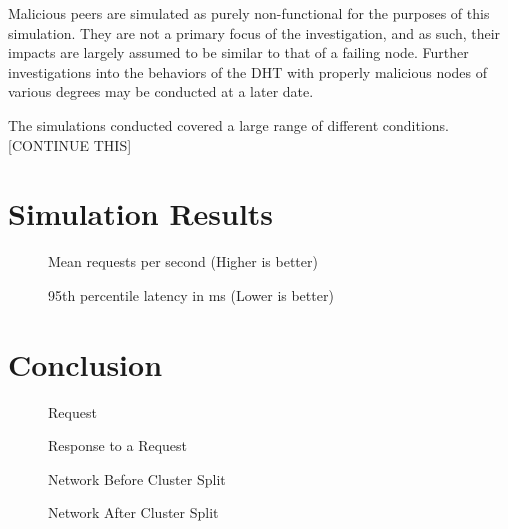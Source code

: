 \documentclass[apa6]{IEEEtran}
\theoremstyle{plain}
\begin{document}
	Malicious peers are simulated as purely non-functional for the purposes of this simulation. They are not a primary focus of the investigation, and as such, their impacts are largely assumed to be similar to that of a failing node. Further investigations into the behaviors of the DHT with properly malicious nodes of various degrees may be conducted at a later date.

	The simulations conducted covered a large range of different conditions. [CONTINUE THIS]

\section{Simulation Results}
	

	\begin{figure}[H]
		\centering
		\hspace*{-0.075\linewidth}
		
		\captionsetup{}
		\caption{Mean requests per second (Higher is better)}
		\label{fig:GMeanRPS}
	\end{figure}

	\begin{figure}[H]
		\centering
		\hspace*{-0.075\linewidth}
		
		\captionsetup{}
		\caption{95th percentile latency in ms (Lower is better)}
		\label{fig:GMeanRPS}
	\end{figure}

\section{Conclusion}






\begin{figure}
	\hspace*{-0.08\linewidth}
	\centering
	
	\caption{Request}
	\vspace{0.2cm}
	
	\label{fig:Request}
	\captionsetup{}
	\caption{Response to a Request}
	\label{fig:Response}
\end{figure}


\begin{figure}
	\hspace*{-0.05\linewidth}
	\centering
	
	\caption{Network Before Cluster Split}
	\vspace{0.2cm}
	\hspace*{-0.16\linewidth}
	
	\captionsetup{}
	\caption{Network After Cluster Split}
	\label{fig:Split}
\end{figure}
\end{document}
